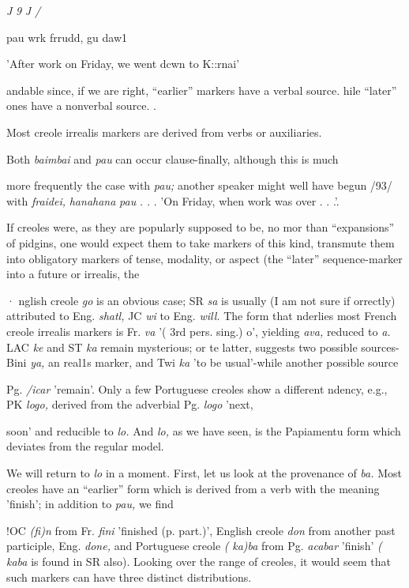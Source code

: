 \textit{J} \textit{9} \textit{J} \textit{/}

pau wrk frrudd, gu daw1

'After work on Friday, we went dcwn to K::rnai'

andable since, if we are right, ``earlier'' markers have a verbal source. hile ``later'' ones have a nonverbal source. .

Most creole irrealis markers are derived from verbs or auxiliaries.

Both \textit{baimbai }and \textit{pau }can occur clause-finally, although this is much

more frequently the case with \textit{pau;} another speaker might well have begun /93/ with \textit{fraidei,} \textit{hanahana} \textit{pau} \textit{.} \textit{.} . 'On Friday, when work was over . . .'.

If creoles were, as they are popularly supposed to be, no mor than ``expansions'' of pidgins, one would expect them to take markers of this kind, transmute them into obligatory markers of tense, modal\-ity, or aspect (the ``later'' sequence-marker into a future or irrealis, the

· nglish creole \textit{go} is an obvious case; SR \textit{sa} is usually (I am not sure if orrectly) attributed to Eng. \textit{shatl,} JC \textit{wi} to Eng. \textit{will.} The form that nderlies most French creole irrealis markers is Fr. \textit{va} '( 3rd pers. sing.) o', yielding \textit{ava,} reduced to \textit{a.} LAC \textit{k}\textit{e} and ST \textit{k}\textit{a} remain mysterious; or te latter, \citet{Ferraz1979} suggests two possible sources-Bini \textit{ya,} an real1s marker, and Twi \textit{ka} 'to be usual'-while another possible source

Pg. \textit{/icar }'remain'. Only a few Portuguese creoles show a different ndency, e.g., PK \textit{logo, }derived from the adverbial Pg. \textit{logo }'next,


soon' and reducible to \textit{lo.} And \textit{lo,} as we have seen, is the Papiamentu form which deviates from the regular model.

We will return to \textit{lo} in a moment. First, let us look at the prove\-nance of \textit{ba.} Most creoles have an ``earlier'' form which is derived from a verb with the meaning 'finish'; in addition to \textit{pau,} we find

!OC \textit{(}\textit{fi)n} from Fr. \textit{fini} 'finished (p. part.)', English creole \textit{don }from another past participle, Eng. \textit{done,} and Portuguese creole \textit{(} \textit{ka)ba }from Pg. \textit{acabar} 'finish' \textit{(} \textit{k}\textit{aba} is found in SR also). Looking over the range of creoles, it would seem that such markers can have three distinct distributions.

